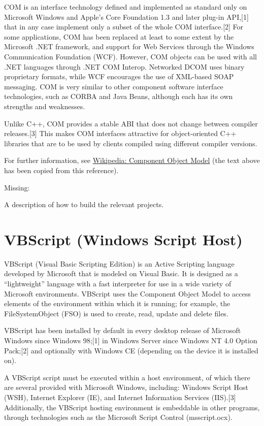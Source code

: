 	\vpara
	COM is an interface technology defined and implemented as standard only on Microsoft Windows and Apple's Core Foundation 1.3 and later plug-in API,[1] that in any case implement only a subset of the whole COM interface.[2] For some applications, COM has been replaced at least to some extent by the Microsoft .NET framework, and support for Web Services through the Windows Communication Foundation (WCF). However, COM objects can be used with all .NET languages through .NET COM Interop. Networked DCOM uses binary proprietary formats, while WCF encourages the use of XML-based SOAP messaging. COM is very similar to other component software interface technologies, such as CORBA and Java Beans, although each has its own strengths and weaknesses.
	
	\vpara
	Unlike C++, COM provides a stable ABI that does not change between compiler releases.[3] This makes COM interfaces attractive for object-oriented C++ libraries that are to be used by clients compiled using different compiler versions.
	
	\vpara
	For further information, see \href{http://en.wikipedia.org/wiki/Component_Object_Model}{Wikipedia: Component Object Model} (the text above has been copied from this reference).
	
	\vpara
	Missing:
	
	A description of how to build the relevant projects.
	
	
	
	
	\newpage
	\section{VBScript (Windows Script Host)}
	VBScript (Visual Basic Scripting Edition) is an Active Scripting language developed by Microsoft that is modeled on Visual Basic. It is designed as a “lightweight” language with a fast interpreter for use in a wide variety of Microsoft environments. VBScript uses the Component Object Model to access elements of the environment within which it is running; for example, the FileSystemObject (FSO) is used to create, read, update and delete files.
	
	\vpara
	VBScript has been installed by default in every desktop release of Microsoft Windows since Windows 98;[1] in Windows Server since Windows NT 4.0 Option Pack;[2] and optionally with Windows CE (depending on the device it is installed on).
	
	\vpara
	A VBScript script must be executed within a host environment, of which there are several provided with Microsoft Windows, including: Windows Script Host (WSH), Internet Explorer (IE), and Internet Information Services (IIS).[3] Additionally, the VBScript hosting environment is embeddable in other programs, through technologies such as the Microsoft Script Control (msscript.ocx).
	
